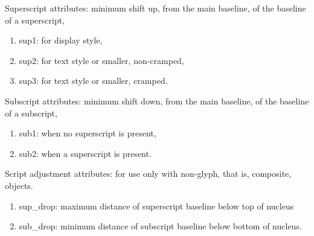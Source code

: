 Superscript attributes: minimum shift up, from the main baseline,
of the baseline of a superscript,
\begin{enumerate} %
\item sup1:
for display style,
\item sup2:
for text style or smaller, non-cramped,
\item sup3:
for text style or smaller, cramped.
\end{enumerate}

Subscript attributes: minimum shift down, from the main baseline,
of the baseline of a subscript,
\begin{enumerate} %
\item sub1:
when no superscript is present,
\item sub2:
when a superscript is present.
\end{enumerate}

Script adjustment attributes: for use only with non-glyph,
that is, composite, objects.
\begin{enumerate} %
\item sup\_drop:
maximum distance of superscript baseline below top of nucleus
\item sub\_drop:
minimum distance of subscript baseline below bottom of nucleus.
\end{enumerate}

